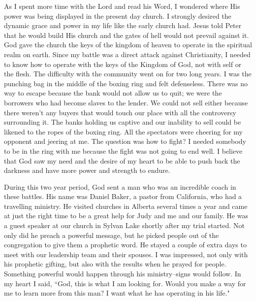 \documentclass[oneside]{book}
\begin{document}
As I spent more time with the Lord and read his Word, I wondered where His power was being displayed in the present day church. I strongly desired the dynamic grace and power in my life like the early church had. Jesus told Peter that he would build His church and the gates of hell would not prevail against it. God gave the church the keys of the kingdom of heaven to operate in the spiritual realm on earth. Since my battle was a direct attack against Christianity, I needed to know how to operate with the keys of the Kingdom of God, not with self or the flesh. The difficulty with the community went on for two long years. I was the punching bag in the middle of the boxing ring and felt defenseless. There was no way to escape because the bank would not allow us to quit; we were the borrowers who had become slaves to the lender. We could not sell either because there weren't any buyers that would touch our place with all the controversy surrounding it. The banks holding us captive and our inability to sell could be likened to the ropes of the boxing ring. All the spectators were cheering for my opponent and jeering at me. The question was how to fight? I needed somebody to be in the ring with me because the fight was not going to end well. I believe that God saw my need and the desire of my heart to be able to push back the darkness and have more power and strength to endure.

During this two year period, God sent a man who was an incredible coach in these battles. His name was Daniel Baker, a pastor from California, who had a travelling ministry. He visited churches in Alberta several times a year and came at just the right time to be a great help for Judy and me and our family. He was a guest speaker at our church in Sylvan Lake shortly after my trial started. Not only did he preach a powerful message, but he picked people out of the congregation to give them a prophetic word. He stayed a couple of extra days to meet with our leadership team and their spouses. I was impressed, not only with his prophetic gifting, but also with the results when he prayed for people. Something powerful would happen through his ministry--signs would follow. In my heart I said, ``God, this is what I am looking for. Would you make a way for me to learn more from this man? I want what he has operating in his life."
\end{document}
